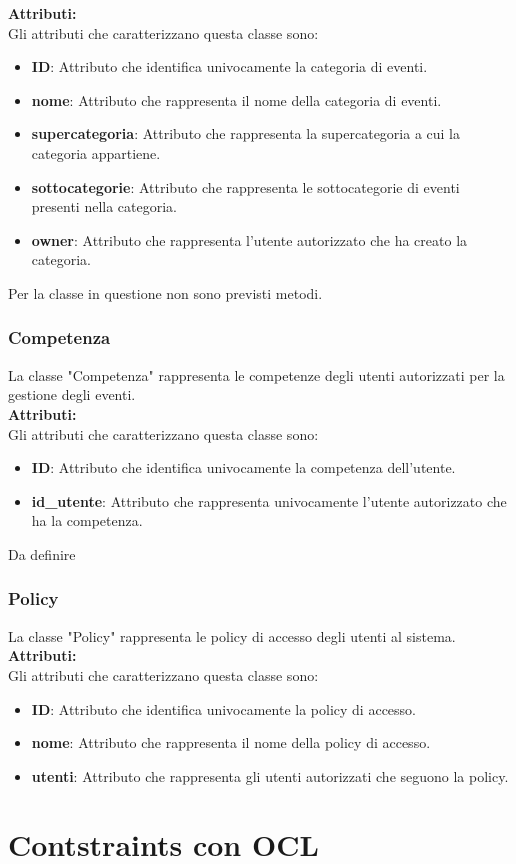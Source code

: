 \documentclass{article}
\begin{document}
\textbf{Attributi:}\\
Gli attributi che caratterizzano questa classe sono:
\begin{itemize}
    \item \textbf{ID}: Attributo che identifica univocamente la categoria di eventi.
    \item \textbf{nome}: Attributo che rappresenta il nome della categoria di eventi.
    \item \textbf{supercategoria}: Attributo che rappresenta la supercategoria a cui la categoria appartiene.
    \item \textbf{sottocategorie}: Attributo che rappresenta le sottocategorie di eventi presenti nella categoria.
    \item \textbf{owner}: Attributo che rappresenta l'utente autorizzato che ha creato la categoria.\\
\end{itemize}
Per la classe in questione non sono previsti metodi.

\subsubsection{Competenza}

La classe "Competenza" rappresenta le competenze degli utenti autorizzati per la gestione degli eventi.\\

\textbf{Attributi:}\\
Gli attributi che caratterizzano questa classe sono:
\begin{itemize}
    \item \textbf{ID}: Attributo che identifica univocamente la competenza dell'utente.
    \item \textbf{id\_utente}: Attributo che rappresenta univocamente l'utente autorizzato che ha la competenza.
\end{itemize}

Da definire

\subsubsection{Policy}

La classe "Policy" rappresenta le policy di accesso degli utenti al sistema.\\

\textbf{Attributi:}\\
Gli attributi che caratterizzano questa classe sono:
\begin{itemize}
    \item \textbf{ID}: Attributo che identifica univocamente la policy di accesso.
    \item \textbf{nome}: Attributo che rappresenta il nome della policy di accesso.
    \item \textbf{utenti}: Attributo che rappresenta gli utenti autorizzati che seguono la policy.
\end{itemize}

\clearpage

\section{Contstraints con OCL}
\end{document}

